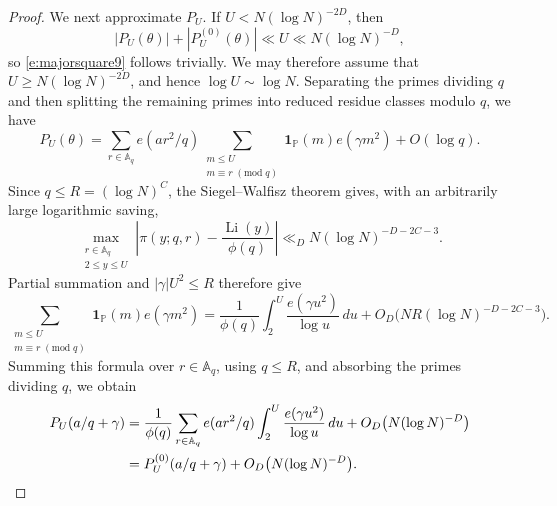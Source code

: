 \documentclass[12pt,reqno]{amsart}
\numberwithin{equation}{section}
\theoremstyle{definition}
\theoremstyle{remark}
\newcommand{\one}{\mathbf{1}}
\begin{document}
\begin{proof}
We next approximate \(P_U\).  If
\(U<N(\log N)^{-2D}\), then
\[
 |P_U(\theta)|+|P_U^{(0)}(\theta)|
 \ll U\ll N(\log N)^{-D},
\]
so \eqref{e:majorsquare9} follows trivially.  We may therefore assume
that \(U\geq N(\log N)^{-2D}\), and hence
\(\log U\sim\log N\).
  Separating the primes
dividing \(q\) and then splitting the remaining primes into reduced
residue classes modulo \(q\), we have
\[
 P_U(\theta)
 =
 \sum_{r\in\mathbb A_q}e(ar^2/q)
 \sum_{\substack{m\leq U\\m\equiv r\;(\mathrm{mod}\;q)}}
 \one_{\mathbb P}(m)e(\gamma m^2)
 +O(\log q).
\]
Since \(q\leq R=(\log N)^C\), the Siegel--Walfisz theorem gives,
with an arbitrarily large logarithmic saving,
\[
 \max_{\substack{r\in\mathbb A_q\\2\leq y\leq U}}
 \left|
 \pi(y;q,r)-\frac{\operatorname{Li}(y)}{\phi(q)}
 \right|
 \ll_D N(\log N)^{-D-2C-3}.
\]
Partial summation and
\(|\gamma|U^2\leq R\) therefore give
\[
 \sum_{\substack{m\leq U\\m\equiv r\;(\mathrm{mod}\;q)}}
 \one_{\mathbb P}(m)e(\gamma m^2)
 =
 \frac1{\phi(q)}
 \int_2^U\frac{e(\gamma u^2)}{\log u}\,du
 +O_D\bigl(NR(\log N)^{-D-2C-3}\bigr).
\]
Summing this formula over \(r\in\mathbb A_q\), using \(q\leq R\), and
absorbing the primes dividing \(q\), we obtain
\begin{align}\label{e:majorsquare9}
 P_U(a/q+\gamma)
 &=
 \frac1{\phi(q)}
 \sum_{r\in\mathbb A_q}e(ar^2/q)
 \int_2^U\frac{e(\gamma u^2)}{\log u}\,du
 +O_D\bigl(N(\log N)^{-D}\bigr)\notag\\
 &=
 P_U^{(0)}(a/q+\gamma)
 +O_D\bigl(N(\log N)^{-D}\bigr).
\end{align}


\end{proof}
\end{document}
